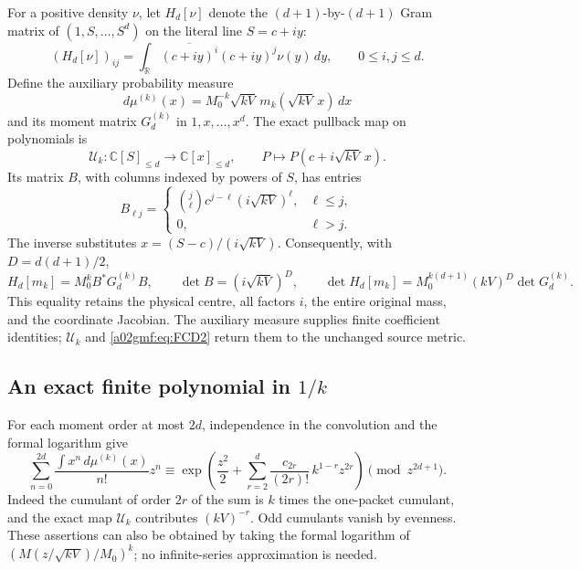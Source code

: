 For a positive density \(\nu\), let \(H_d[\nu]\) denote the
\((d+1)\)-by-\((d+1)\) Gram matrix of
\((1,S,\ldots,S^d)\) on the literal line \(S=c+iy\):
\[
 (H_d[\nu])_{ij}
   =\int_{\mathbb R}\overline{(c+iy)^i}(c+iy)^j\nu(y)\,dy,
       \qquad 0\le i,j\le d.
\]
Define the auxiliary probability measure
\[
 d\mu^{(k)}(x)
  =M_0^{-k}\sqrt{kV}\,m_k(\sqrt{kV}\,x)\,dx
\]
and its moment matrix \(G_d^{(k)}\) in \(1,x,\ldots,x^d\).
The exact pullback map on polynomials is
\[
 \mathcal U_k:\mathbb C[S]_{\le d}\longrightarrow\mathbb C[x]_{\le d},
 \qquad P\longmapsto P(c+i\sqrt{kV}\,x).
\]
Its matrix \(B\), with columns indexed by powers of \(S\), has entries
\[
 B_{\ell j}=
 \begin{cases}
 \binom j\ell c^{j-\ell}(i\sqrt{kV})^\ell,&\ell\le j,\\
 0,&\ell>j .
 \end{cases}
\]
The inverse substitutes \(x=(S-c)/(i\sqrt{kV})\).
Consequently, with \(D=d(d+1)/2\),
\begin{equation}
 H_d[m_k]=M_0^kB^*G_d^{(k)}B,\qquad
 \det B=(i\sqrt{kV})^D,\qquad
 \det H_d[m_k]=M_0^{k(d+1)}(kV)^D\det G_d^{(k)} .
 \tag{FCD2}\label{a02gmf:eq:FCD2}
\end{equation}
This equality retains the physical centre, all factors \(i\), the entire
original mass, and the coordinate Jacobian. The auxiliary measure supplies
finite coefficient identities; \(\mathcal U_k\) and \eqref{a02gmf:eq:FCD2}
return them to the unchanged source metric.

\subsection{An exact finite polynomial in \(1/k\)}

For each moment order at most \(2d\), independence in the convolution and
the formal logarithm give
\begin{equation}
 \sum_{n=0}^{2d}\frac{\int x^n\,d\mu^{(k)}(x)}{n!}z^n
 \equiv
 \exp\left(\frac{z^2}{2}
       +\sum_{r=2}^{d}\frac{c_{2r}}{(2r)!}\,
                    k^{1-r}z^{2r}\right)\pmod {z^{2d+1}}.
 \tag{FCD3}\label{a02gmf:eq:FCD3}
\end{equation}
Indeed the cumulant of order \(2r\) of the sum is \(k\) times the
one-packet cumulant, and the exact map \(\mathcal U_k\) contributes
\((kV)^{-r}\). Odd cumulants vanish by evenness. These assertions can
also be obtained by taking the formal logarithm of
\((M(z/\sqrt{kV})/M_0)^k\); no infinite-series approximation is needed.

